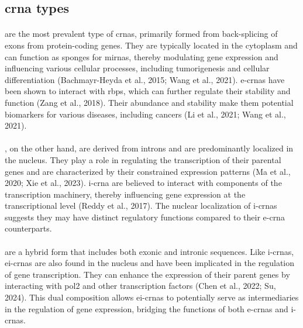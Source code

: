 \subsection{\gls{crna} types}
\label{sec:circrna_types}

\paragraph{} are the most prevalent type of
\glspl{crna}, primarily formed from back-splicing of exons from protein-coding
genes.
They are typically located in the cytoplasm and can function as sponges for
\glspl{mirna}, thereby modulating gene expression and influencing various
cellular processes, including tumorigenesis and cellular differentiation
(Bachmayr-Heyda et al., 2015; Wang et al., 2021).
\glspl{e-crna} have been shown to interact with \glspl{rbp}, which can
further regulate their stability and function (Zang et al., 2018).
Their abundance and stability make them potential biomarkers for various
diseases, including cancers (Li et al., 2021; Wang et al., 2021).

\paragraph{}, on the other hand, are derived
from introns
and are predominantly localized in the nucleus.
They play a role in regulating the transcription of their parental genes and
are characterized by their constrained expression patterns (Ma et al., 2020;
Xie et al., 2023).
\gls{i-crna} are
believed to interact with components of the transcription machinery, thereby
influencing gene expression at the transcriptional level (Reddy et al., 2017).
The nuclear localization of \glspl{i-crna} suggests they may have distinct
regulatory functions compared to their \gls{e-crna} counterparts.

\paragraph{} are a hybrid form that
includes both
exonic and intronic sequences.
Like \glspl{i-crna}, \glspl{ei-crna} are also found in the nucleus and have
been implicated in the regulation of gene transcription.
They can enhance the expression of their parent genes by interacting with
\gls{pol2} and other transcription factors (Chen et al., 2022; Su, 2024).
This dual composition allows \glspl{ei-crna} to potentially serve as
intermediaries in the regulation of gene expression, bridging the functions of
both \glspl{e-crna} and \glspl{i-crna}.

